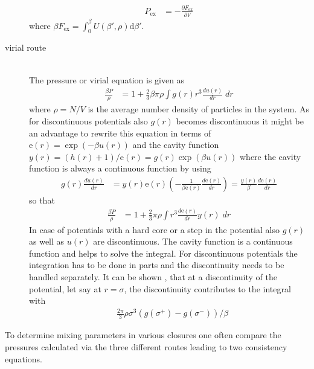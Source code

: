 \begin{description}
\begin{align}
P_\text{ex} &= - \frac{\partial F_\text{ex}}{\partial V}
\end{align}
where $\beta F_\text{ex} = \int_0^\beta U(\beta',\rho) \mathrm{d}\beta'$.
\item [virial route] ~\vphantom{.} \\
The pressure or virial equation is given as
\begin{align} \label{eq:pressure_virial1}
\frac{\beta P}{\rho} &= 1+\frac{2}{3} \beta\pi\rho\int g(r) r^3 \frac{du(r)}{dr} \; dr
\end{align}
where $\rho= N/V$ is the average number density of particles in the system. As for discontinuous
potentials also $g(r)$ becomes discontinuous it might be an advantage to rewrite
this equation in terms of $\mathrm{e}(r) = \exp(-\beta u(r))$ and the cavity
function $y(r) = (h(r)+1)/\mathrm{e}(r) = g(r)\exp(\beta u(r))$ where the cavity function
is always a continuous function by using
\begin{align}
g(r) \frac{du(r)}{dr} &= y(r) \mathrm{e}(r)
             \left(-\frac{1}{\beta \mathrm{e}(r)}\frac{d \mathrm{e}(r)}{dr}\right)
                       = \frac{y(r)}{\beta}\frac{d \mathrm{e}(r)}{dr}
\end{align}
so that
\begin{align} \label{eq:pressure_virial2}
\frac{\beta P}{\rho} &= 1+\frac{2}{3} \pi\rho\int r^3 \frac{d\mathrm{e}(r)}{dr} y(r) \; dr
\end{align}
In case of potentials with a hard core or a step in the potential also $g(r)$ as well as $u(r)$ are discontinuous.
The cavity function is a continuous function and helps to solve the integral.
For discontinuous potentials the integration has to be done in parts and the
discontinuity needs to be handled separately. It can be shown \cite{Smith1977}, that at a
discontinuity of the potential, let say at $r=\sigma$, the discontinuity contributes
to the integral with
\begin{align}
& \frac{2\pi}{3}\rho\sigma^3\left(g(\sigma^+)-g(\sigma^-)\right)/\beta
\end{align}
\end{description}
To determine mixing parameters in various closures one often compare
the pressures calculated via the three different routes leading to
two consistency equations.

